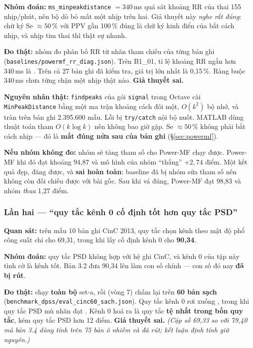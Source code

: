 \textbf{Nhóm đoán:} \texttt{ms\_minpeakdistance} $= 340$\,ms quá sát khoảng RR của thai 155 nhịp/phút,
nên bộ dò bỏ mất một nhịp trên hai. Giả thuyết này \textit{nghe rất đúng}: chữ ký Se $\approx 50$\,\%
với PPV gần 100\,\% đúng là chữ ký kinh điển của bắt cách nhịp, và nhịp tim thai thì thật sự nhanh.

\textbf{Đo thật:} nhóm đo phân bố RR từ nhãn tham chiếu của từng bản ghi
(\texttt{baselines/powermf\_rr\_diag.json}). Trên B1\_01, tỉ lệ khoảng RR ngắn hơn 340\,ms là
. Trên cả 27 bản ghi đã kiểm tra, giá trị lớn nhất là 0,15\,\%. Ràng buộc 340\,ms chưa
từng chặn một nhịp thật nào. \textbf{Giả thuyết sai.}

\textbf{Nguyên nhân thật:} \texttt{findpeaks} của gói \texttt{signal} trong Octave cài
\texttt{MinPeakDistance} bằng một ma trận khoảng cách đôi một, $O(k^2)$ bộ nhớ, và tràn trên bản ghi
2.395.600 mẫu. Lỗi bị \texttt{try/catch} nội bộ nuốt. MATLAB dùng thuật toán tham $O(k \log k)$ nên
không bao giờ gặp. Se $\approx 50$\,\% không phải bắt cách nhịp --- đó là \textbf{mất đúng nửa sau của
bản ghi} (\S\ref{sec:powermf}).

\textbf{Nếu nhóm không đo:} nhóm sẽ tăng tham số cho Power-MF chạy được. Power-MF khi đó đạt khoảng 94,87
và mô hình của nhóm ``thắng'' $+2{,}74$ điểm. Một kết quả đẹp, đăng được, và \textbf{sai hoàn toàn}:
baseline đã bị nhóm sửa tham số nên không còn đối chiếu được với bài gốc. Sau khi vá đúng, Power-MF đạt
98,83 và nhóm \textit{thua} 1,27 điểm.

\subsubsection{Lần hai --- ``quy tắc kênh 0 cố định tốt hơn quy tắc PSD''}

\textbf{Quan sát:} trên mẫu 10 bản ghi CinC 2013, quy tắc chọn kênh theo mật độ phổ công suất chỉ cho
69,31, trong khi lấy cố định kênh 0 cho \textbf{90,34}.

\textbf{Nhóm đoán:} quy tắc PSD không hợp với hệ ghi CinC, và kênh 0 của tập này tình cờ là kênh tốt.
Bản 3.2 đưa 90,34 lên làm con số chính --- con số đó nay \textbf{đã bị rút}.

\textbf{Đo thật:} chạy \textbf{toàn bộ} set-a, rồi (vòng 7) chấm lại trên \textbf{60 bản sạch}
(\texttt{benchmark\_dpss/eval\_cinc60\_sach.json}). Quy tắc kênh 0 rơi xuống , trong khi quy
tắc PSD mù nhãn đạt . Kênh 0 hoá ra là quy tắc \textbf{tệ nhất trong bốn quy tắc}, kém quy
tắc PSD hơn 12 điểm. \textbf{Giả thuyết sai.} \textit{(Cặp số 69,33 so với 79,40 mà bản 3.4 dùng tính
trên 75 bản ô nhiễm và đã rút; kết luận định tính giữ nguyên.)}

